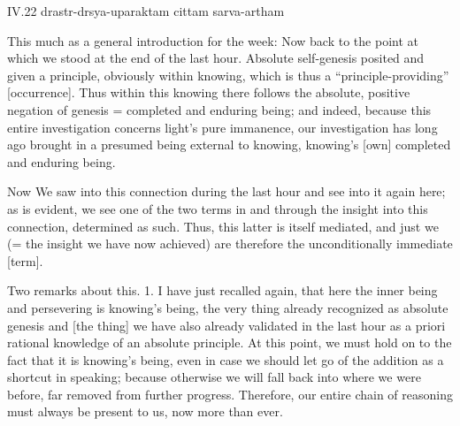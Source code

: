 IV.22
drastr-drsya-uparaktam cittam sarva-artham

This much as a general introduction for the week:
Now back to the point at which we stood at the end of the last hour.
Absolute self-genesis posited and given a principle,
obviously within knowing,
which is thus a “principle-providing” [occurrence].
Thus within this knowing there follows
the absolute, positive negation of genesis =
completed and enduring being;
and indeed, because this entire investigation
concerns light's pure immanence,
our investigation has long ago brought in
a presumed being external to knowing,
knowing's [own] completed and enduring being.

Now We saw into this connection during the last hour
and see into it again here;
as is evident, we see one of the two terms
in and through the insight into this connection,
determined as such.
Thus, this latter is itself mediated,
and just we (= the insight we have now achieved) are
therefore the unconditionally immediate [term].

Two remarks about this.
1. I have just recalled again,
that here the inner being and persevering is knowing's being,
the very thing already recognized as absolute genesis
and [the thing] we have also already validated in the last hour
as a priori rational knowledge of an absolute principle.
At this point, we must hold on to
the fact that it is knowing's being,
even in case we should let go of
the addition as a shortcut in speaking;
because otherwise we will fall back into
where we were before, far removed from further progress.
Therefore, our entire chain of reasoning
must always be present to us, now more than ever.

